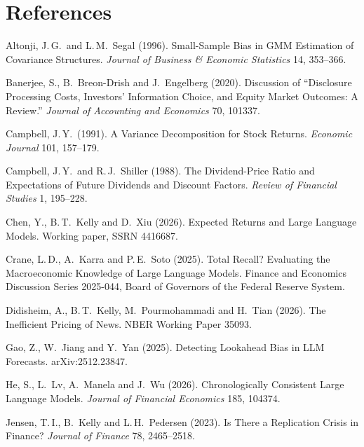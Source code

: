 \documentclass[11pt,letterpaper]{article}
\theoremstyle{remark}
\begin{document}
\section*{References}
\begin{enumerate}[label={[\arabic*]},leftmargin=*]

\item Altonji, J.\,G.\ and L.\,M.\ Segal (1996). Small-Sample Bias in GMM Estimation of Covariance Structures.
\emph{Journal of Business \& Economic Statistics} 14, 353--366.



\item Banerjee, S., B.\ Breon-Drish and J.\ Engelberg (2020). Discussion of ``Disclosure Processing Costs, Investors' Information Choice, and Equity Market Outcomes: A Review.''
\emph{Journal of Accounting and Economics} 70, 101337.

\item Campbell, J.\,Y.\ (1991). A Variance Decomposition for Stock Returns.
\emph{Economic Journal} 101, 157--179.

\item Campbell, J.\,Y.\ and R.\,J.\ Shiller (1988). The Dividend-Price Ratio and Expectations of Future Dividends and Discount Factors.
\emph{Review of Financial Studies} 1, 195--228.

\item Chen, Y., B.\,T.\ Kelly and D.\ Xiu (2026). Expected Returns and Large Language Models.
Working paper, SSRN 4416687.

\item Crane, L.\,D., A.\ Karra and P.\,E.\ Soto (2025). Total Recall? Evaluating the Macroeconomic Knowledge of Large Language Models.
Finance and Economics Discussion Series 2025-044, Board of Governors of the Federal Reserve System.

\item Didisheim, A., B.\,T.\ Kelly, M.\ Pourmohammadi and H.\ Tian (2026). The Inefficient Pricing of News.
NBER Working Paper 35093.

\item Gao, Z., W.\ Jiang and Y.\ Yan (2025). Detecting Lookahead Bias in LLM Forecasts.
arXiv:2512.23847.

\item He, S., L.\ Lv, A.\ Manela and J.\ Wu (2026). Chronologically Consistent Large Language Models.
\emph{Journal of Financial Economics} 185, 104374.

\item Jensen, T.\,I., B.\ Kelly and L.\,H.\ Pedersen (2023). Is There a Replication Crisis in Finance?
\emph{Journal of Finance} 78, 2465--2518.




\end{enumerate}
\end{document}
